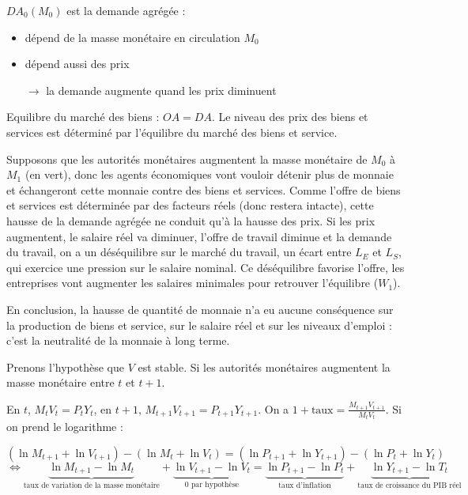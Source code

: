 	$DA_0(M_0)$ est la demande agrégée :
	
	\begin{itemize}
		\item dépend de la masse monétaire en circulation $M_0$
		\item dépend aussi des prix
		\item[$\rightarrow$] la demande augmente quand les prix diminuent
	\end{itemize}
	
	Equilibre du marché des biens : $OA = DA$. Le niveau des prix des biens et services est déterminé par l'équilibre du marché des biens et service.
	
	Supposons que les autorités monétaires augmentent la masse monétaire de $M_0$ à $M_1$ (en vert), donc les agents économiques vont vouloir détenir plus de monnaie et échangeront cette monnaie contre des biens et services. Comme l'offre de biens et services est déterminée par des facteurs réels (donc restera intacte), cette hausse de la demande agrégée ne conduit qu'à la hausse des prix. Si les prix augmentent, le salaire réel va diminuer, l'offre de travail diminue et la demande du travail, on a un déséquilibre sur le marché du travail, un écart entre $L_E$ et $L_S$, qui exercice une pression sur le salaire nominal. Ce déséquilibre favorise l'offre, les entreprises vont augmenter les salaires minimales pour retrouver l'équilibre ($W_1$).
	
	En conclusion, la hausse de quantité de monnaie n'a eu aucune conséquence sur la production de biens et service, sur le salaire réel et sur les niveaux d'emploi : c'est la neutralité de la monnaie à long terme.
	
	
	Prenons l'hypothèse que $V$ est stable. Si les autorités monétaires augmentent la masse monétaire entre $t$ et $t + 1$.
	
	En $t$, $M_t V_t = P_t Y_t$, en $t + 1$, $M_{t + 1} V_{t + 1} = P_{t + 1} Y_{t + 1}$. On a $1 + \text{taux} = \frac{M_{t + 1} V_{t + 1}}{M_t V_t}$. Si on prend le logarithme :
	
	$$(\ln M_{t + 1} + \ln V_{t + 1}) - (\ln M_t + \ln V_t) = (\ln P_{t + 1} + \ln Y_{t + 1}) - (\ln P_t + \ln Y_t)$$
	$$\Leftrightarrow \underbrace{\ln M_{t + 1} - \ln M_t}_{\text{taux de variation de la masse monétaire}} + \underbrace{\ln V_{t + 1} - \ln V_t}_{0\text{ par hypothèse}} = \underbrace{\ln P_{t + 1} -\ln P_t}_{\text{taux d'inflation}} + \underbrace{\ln Y_{t + 1} - \ln T_t}_{\text{taux de croissance du PIB réel}}$$

